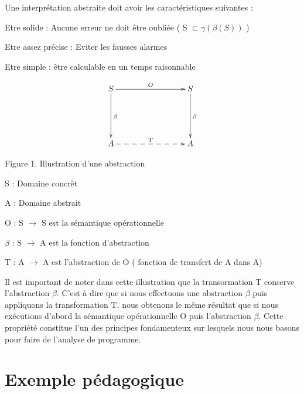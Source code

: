 \documentclass[french]{article}
\begin{document}
Une interprétation abstraite doit avoir les caractéristiques suivantes :
\begin{description}
    \item Etre solide : Aucune erreur ne doit être oubliée ( S $\subset \gamma(\beta(S))$ )
    \item Etre assez précise : Eviter les fausses alarmes
    \item Etre simple : être calculable en un temps raisonnable
\end{description}

 \begin{equation*}
  \xymatrix@C+6em@R+3em{
   S \ar[r]^{O} \ar[d]^{\beta} & S \ar[d]^{\beta} \\
    A \ar@{-->}[r]^{T} & A
  }
 \end{equation*}

 \begin{center}Figure 1. Illustration d'une abstraction \end{center}

\begin{description}
  \item S : Domaine concrèt
    \item A : Domaine abstrait
    \item O : S $\rightarrow$ S est la sémantique opérationnelle
    \item $\beta$ : S $\rightarrow$ A est la fonction d'abstraction
    \item T : A $\rightarrow$ A est l'abstraction de O ( fonction de transfert de A dans A)
\end{description}

Il est important de noter dans cette illustration que la transormation T conserve l'abstraction $\beta$. C'est à dire que si nous effectuons une abstraction $\beta$ puis appliquons la transformation T, nous obtenons le même résultat que si nous exécutions d'abord la sémantique opérationnelle O puis l'abstraction $\beta$. Cette propriété constitue l'un des principes fondamenteux sur lesquels nous nous basons pour faire de l'analyse de programme.

\section{Exemple pédagogique}
\end{document}
